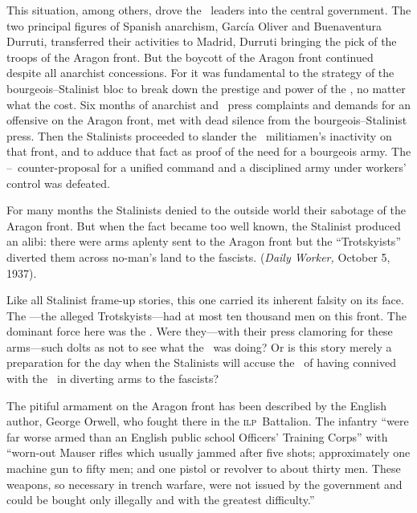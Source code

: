 \indexCNT
This situation, among others, drove the \CNT\ leaders into the central government. The two principal figures of Spanish anarchism, Garc\'ia Oliver and Buenaventura Durruti, transferred their activities to Madrid, Durruti bringing the pick of the troops of the Aragon front. But the boycott of the Aragon front continued despite all anarchist concessions. For it was fundamental to the strategy of the bourgeois--Stalinist bloc to break down the prestige and power of the \CNT, no matter what the cost. Six months of anarchist and \POUM\ press complaints and demands for an offensive on the Aragon front, met with dead silence from the bourgeois--Stalinist press. Then the Stalinists proceeded to slander the \CNT\ militiamen’s inactivity on that front, and to adduce that fact as proof of the need for a bourgeois army. The \CNT--\POUM\ counter-proposal for a unified command and a disciplined army under workers’ control was defeated.

\indexPOUM{}
For many months the Stalinists denied to the outside world their sabotage of the Aragon front. But when the fact became too well known, the Stalinist produced an alibi: there were arms aplenty sent to the Aragon front but the ``Trotskyists'' diverted them across no-man’s land to the fascists. (\emph{Daily Worker,} October 5, 1937).

Like all Stalinist frame-up stories, this one carried its inherent falsity on its face. The \POUM---the alleged Trotskyists---had at most ten thousand men on this front. The dominant force here was the \CNT. Were they---with their press clamoring for these arms---such dolts as not to see what the \POUM\ was doing? Or is this story merely a preparation for the day when the Stalinists will accuse the \CNT\ of having connived with the \POUM\ in diverting arms to the fascists?
\indexCNT

The pitiful armament on the Aragon front has been described by the English author, George Orwell, who fought there in the \textsc{ilp}~Battalion. The infantry ``were far worse armed than an English public school Officers’ Training Corps'' with ``worn-out Mauser rifles which usually jammed after five shots; approximately one machine gun to fifty men; and one pistol or revolver to about thirty men. These weapons, so necessary in trench warfare, were not issued by the government and could be bought only illegally and with the greatest difficulty.''

